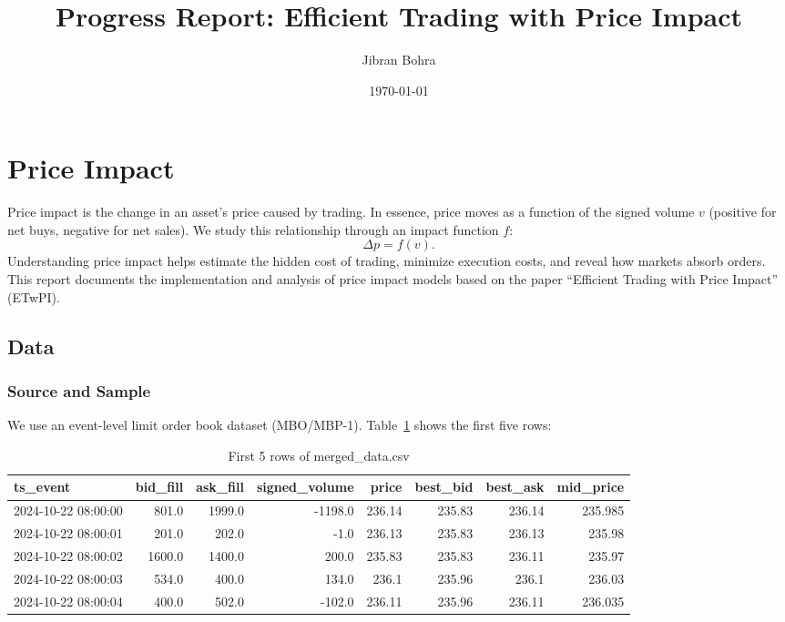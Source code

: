 \documentclass{article}
\title{Progress Report: Efficient Trading with Price Impact}
\author{Jibran Bohra}
\date{\today}
\begin{document}
\maketitle

\section{Price Impact}
Price impact is the change in an asset's price caused by trading. In essence, price moves as a function of the signed volume $v$ (positive for net buys, negative for net sales). We study this relationship through an impact function $f$:
\begin{equation}
\Delta p = f(v).
\end{equation}
Understanding price impact helps estimate the hidden cost of trading, minimize execution costs, and reveal how markets absorb orders. This report documents the implementation and analysis of price impact models based on the paper ``Efficient Trading with Price Impact'' (ETwPI). 

\subsection{Data}
\subsubsection{Source and Sample}
We use an event-level limit order book dataset (MBO/MBP-1). Table~\ref{tab:first5_merged_data} shows the first five rows:
\begin{table}[ht]
\centering
\caption{First 5 rows of merged\_data.csv}
\label{tab:first5_merged_data}
\begin{tabular}{lrrrrrrr}
\hline
ts\_event & bid\_fill & ask\_fill & signed\_volume & price & best\_bid & best\_ask & mid\_price \\
\hline
2024-10-22 08:00:00 & 801.0 & 1999.0 & -1198.0 & 236.14 & 235.83 & 236.14 & 235.985 \\
2024-10-22 08:00:01 & 201.0 & 202.0 & -1.0 & 236.13 & 235.83 & 236.13 & 235.98 \\
2024-10-22 08:00:02 & 1600.0 & 1400.0 & 200.0 & 235.83 & 235.83 & 236.11 & 235.97 \\
2024-10-22 08:00:03 & 534.0 & 400.0 & 134.0 & 236.1 & 235.96 & 236.1 & 236.03 \\
2024-10-22 08:00:04 & 400.0 & 502.0 & -102.0 & 236.11 & 235.96 & 236.11 & 236.035 \\
\hline
\end{tabular}
\end{table}
\end{document}
